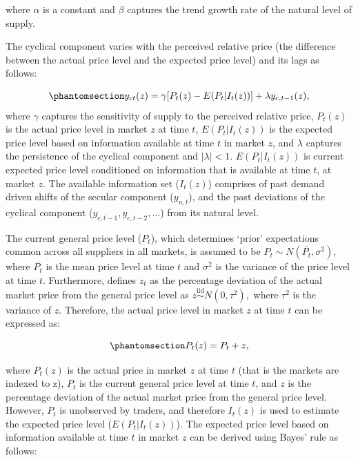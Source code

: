 \documentclass[
  letterpaper,
  DIV=11,
  numbers=noendperiod]{scrartcl}
\begin{document}
where \(\alpha\) is a constant and \(\beta\) captures the trend growth
rate of the natural level of supply.

The cyclical component varies with the perceived relative price (the
difference between the actual price level and the expected price level)
and its lags as follows:

\begin{equation}\phantomsection\label{eq-cyclical_component}{ y_{ct}(z) = \gamma[P_t(z) - E(P_t | I_t(z))] + \lambda y_{c, t-1}(z), }\end{equation}
where \(\gamma\) captures the sensitivity of supply to the perceived
relative price, \(P_t(z)\) is the actual price level in market \(z\) at
time \(t\), \(E(P_t | I_t(z))\) is the expected price level based on
information available at time \(t\) in market \(z\), and \(\lambda\)
captures the persistence of the cyclical component and
\(|\lambda| < 1\). \(E(P_t | I_t(z))\) is current expected price level
conditioned on information that is available at time \(t\), at market
\(z\). The available information set (\(I_t(z)\)) comprises of past
demand driven shifts of the secular component (\(y_{n,t}\)), and the
past deviations of the cyclical component
(\(y_{c, t-1}, y_{c, t-2}, ...\)) from its natural level.

The current general price level (\(P_t\)), which determines `prior'
expectations common across all suppliers in all markets, is assumed to
be \(P_t \sim N(\overline{P_t}, \sigma^2),\) where \(\overline{P_t}\) is
the mean price level at time \(t\) and \(\sigma^2\) is the variance of
the price level at time \(t\). Furthermore, \citet{lucas1973} defines
\(z_t\) as the percentage deviation of the actual market price from the
general price level as \(z\overset{\text{iid}}{\sim} N(0, \tau^2),\)
where \(\tau^2\) is the variance of \(z\). Therefore, the actual price
level in market \(z\) at time \(t\) can be expressed as:

\begin{equation}\phantomsection\label{eq-price_decomposition}{P_t(z) = P_t + z, }\end{equation}

where \(P_t(z)\) is the actual price in market \(z\) at time \(t\) (that
is the markets are indexed to z), \(P_t\) is the current general price
level at time \(t\), and \(z\) is the percentage deviation of the actual
market price from the general price level. However, \(P_t\) is
unobserved by traders, and therefore \(I_t(z)\) is used to estimate the
expected price level (\(E(P_t| I_t(z))\)). The expected price level
based on information available at time \(t\) in market \(z\) can be
derived using Bayes' rule as follows:
\end{document}
